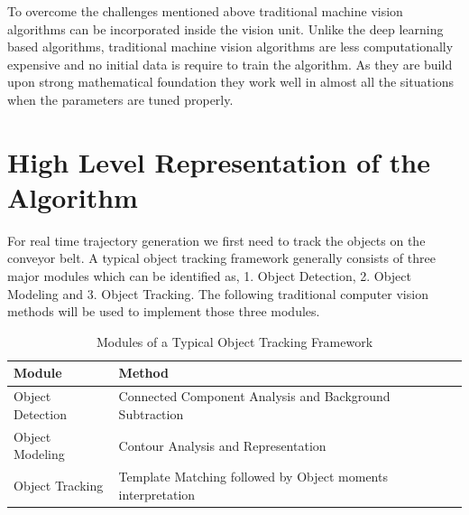 \documentclass[a4paper,12pt]{book}%
\begin{document}
To overcome the challenges mentioned above traditional machine vision algorithms can be incorporated inside the vision unit. Unlike the deep learning based algorithms, traditional machine vision algorithms  are less computationally expensive and no initial data is require to train the algorithm. As they are build upon strong mathematical foundation they work well in almost all the situations when the parameters are tuned properly.

\section{High Level Representation of the Algorithm}

For real time trajectory generation we first need to track the objects on the conveyor belt. A typical object tracking framework generally consists of three major modules which can be identified as, 1. Object Detection, 2. Object Modeling and 3. Object Tracking. The following traditional computer vision methods will be used to implement those three modules.\\

\begin{table}[!h]
	\centering
	\begin{tabular}[!h]{|l | l|}
		\hline
		\textbf{Module} & \textbf{Method}\\
		\hline
		Object Detection &  Connected Component Analysis and Background Subtraction\\
		Object Modeling & Contour Analysis and Representation\\
		Object Tracking & Template Matching followed by Object moments interpretation\\ 
		\hline\hline
	\end{tabular}
\caption{Modules of a Typical Object Tracking Framework}
\end{table}
	
%
%
\end{document}
